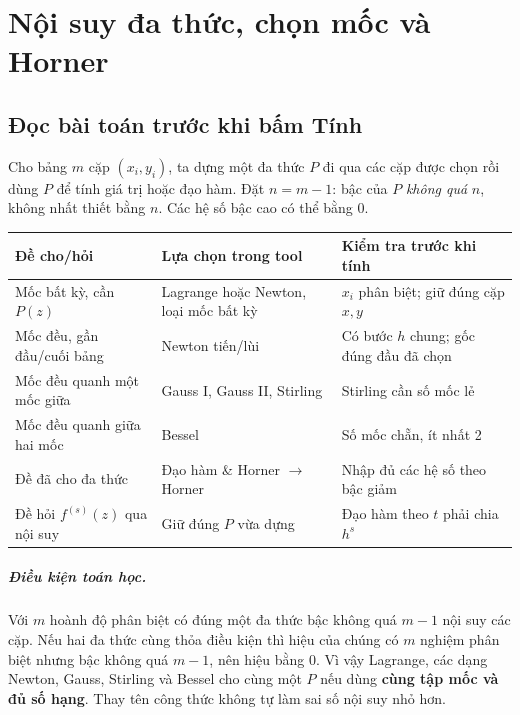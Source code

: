 \chapter{Nội suy đa thức, chọn mốc và Horner}
\label{ch:interp}


\section{Đọc bài toán trước khi bấm Tính}

Cho bảng $m$ cặp $(x_i,y_i)$, ta dựng một đa thức $P$ đi qua các cặp được chọn rồi dùng $P$ để tính giá trị hoặc đạo hàm. Đặt $n=m-1$: bậc của $P$ \emph{không quá} $n$, không nhất thiết bằng $n$. Các hệ số bậc cao có thể bằng 0.

\begin{center}\small
\begin{tabular}{@{}p{.25\linewidth}p{.32\linewidth}p{.31\linewidth}@{}}
\toprule
Đề cho/hỏi & Lựa chọn trong tool & Kiểm tra trước khi tính\\
\midrule
Mốc bất kỳ, cần $P(z)$ & Lagrange hoặc Newton, loại mốc bất kỳ & $x_i$ phân biệt; giữ đúng cặp $x,y$\\
Mốc đều, gần đầu/cuối bảng & Newton tiến/lùi & Có bước $h$ chung; gốc đúng đầu đã chọn\\
Mốc đều quanh một mốc giữa & Gauss I, Gauss II, Stirling & Stirling cần số mốc lẻ\\
Mốc đều quanh giữa hai mốc & Bessel & Số mốc chẵn, ít nhất 2\\
Đề đã cho đa thức & Đạo hàm \& Horner $\to$ Horner & Nhập đủ các hệ số theo bậc giảm\\
Đề hỏi $f^{(s)}(z)$ qua nội suy & Giữ đúng $P$ vừa dựng & Đạo hàm theo $t$ phải chia $h^s$\\
\bottomrule
\end{tabular}\end{center}

\paragraph{Điều kiện toán học.} Với $m$ hoành độ phân biệt có đúng một đa thức bậc không quá $m-1$ nội suy các cặp. Nếu hai đa thức cùng thỏa điều kiện thì hiệu của chúng có $m$ nghiệm phân biệt nhưng bậc không quá $m-1$, nên hiệu bằng 0. Vì vậy Lagrange, các dạng Newton, Gauss, Stirling và Bessel cho cùng một $P$ nếu dùng \textbf{cùng tập mốc và đủ số hạng}. Thay tên công thức không tự làm sai số nội suy nhỏ hơn.

